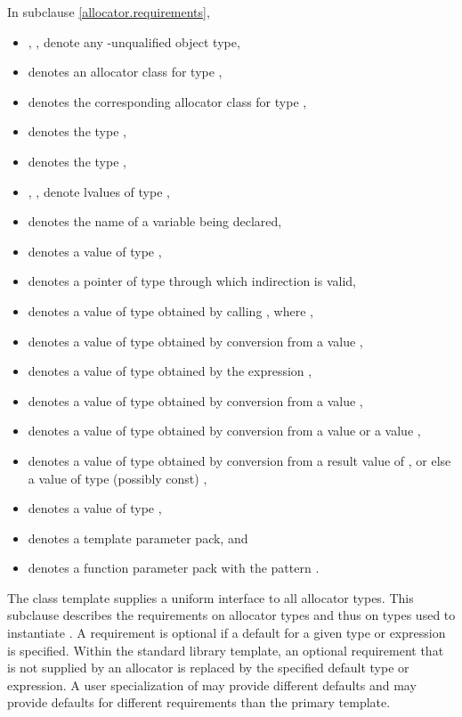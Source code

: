 \pnum
In subclause \ref{allocator.requirements},
\begin{itemize}
\item
{}, ,  denote
any \cv-unqualified object type,
\item
{} denotes an allocator class for type ,
\item
{} denotes the corresponding allocator class for type ,
\item
{} denotes the type ,
\item
{} denotes the type ,
\item
{}, ,  denote lvalues of type ,
\item
{} denotes the name of a variable being declared,
\item
{} denotes a value of type ,
\item
{} denotes a pointer of type 
through which indirection is valid,
\item
{} denotes a value of type 
obtained by calling , where ,
\item
{} denotes a value of type 
obtained by conversion from a value ,
\item
{} denotes a value of type 
obtained by the expression ,
\item
{} denotes a value of type 
obtained by conversion from a value ,
\item
{} denotes a value of type 
obtained by conversion from a value  or a value ,
\item
{} denotes a value of type 
obtained by conversion from a result value of , or else
a value of type (possibly const) ,
\item
{} denotes a value of type ,
\item
{} denotes a template parameter pack, and
\item
{} denotes
a function parameter pack with the pattern .
\end{itemize}

\pnum
The class template  supplies
a uniform interface to all allocator types.
This subclause
describes the requirements on allocator types
and thus on types used to instantiate .
A requirement is optional if a default for a
given type or expression is specified.
Within the standard library 
template, an optional requirement that is not supplied by an allocator is
replaced by the specified default type or expression. A user specialization of
 may provide different defaults and may provide
defaults for different requirements than the primary template.

